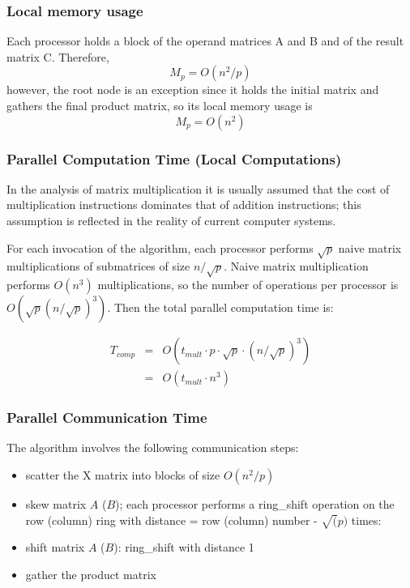 \documentclass{article}
\begin{document}
\subsubsection{Local memory usage}

Each processor holds a block of the operand matrices A and B and of the result
matrix C. Therefore, $$M_p = O(n^2/p)$$ however, the root node is an exception
since it holds the initial matrix and gathers the final product matrix, so its
local memory usage is $$M_p = O(n^2)$$

\subsubsection{Parallel Computation Time (Local Computations)}

In the analysis of matrix multiplication it is usually assumed that the cost of
multiplication instructions dominates that of addition instructions; this
assumption is reflected in the reality of current computer systems.

For each invocation of the algorithm, each processor performs $\sqrt{p}$ naive
matrix multiplications of submatrices of size $n/\sqrt{p}$. Naive matrix
multiplication performs $O(n^3)$ multiplications, so the number of operations
per processor is $O(\sqrt{p}(n/\sqrt{p})^3)$. Then the total parallel
computation time is: 

\begin{eqnarray*}
T_{{comp}} 	&=& O(t_{{mult}} \cdot p \cdot \sqrt{p} \cdot (n/\sqrt{p})^3) \\ 
			&=& O(t_{{mult}} \cdot n^3)
\end{eqnarray*}

\subsubsection{Parallel Communication Time}

The algorithm involves the following communication steps:
\begin{itemize}
	\item scatter the X matrix into blocks of size $O(n^2/p)$
	\item skew matrix $A$ ($B$); each processor performs a ring\_shift operation on
	the row (column) ring with distance = row (column) number - $\sqrt(p)$ times:
	\item shift matrix $A$ ($B$): ring\_shift with distance 1
	\item gather the product matrix
\end{itemize}
\end{document}
